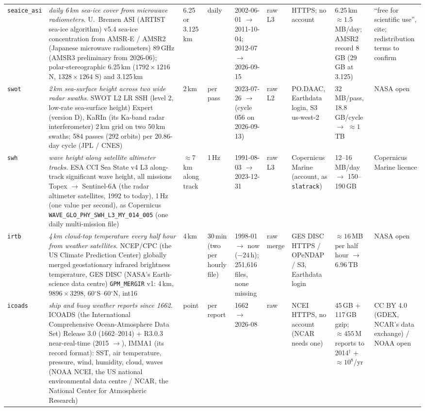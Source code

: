 \documentclass[10pt]{article}
\newcommand{\code}[1]{\texttt{#1}}
\begin{document}
{\begin{longtable}{@{}L{1.7cm}L{2.85cm}L{1.15cm}L{1.25cm}L{1.7cm}L{1.15cm}L{1.95cm}L{1.5cm}L{1.45cm}@{}}
\addlinespace
\code{seaice\_\allowbreak asi} & \emph{daily 6\,km sea-ice cover from microwave radiometers.} U.\ Bremen ASI (ARTIST sea-ice algorithm) v5.4 sea-ice concentration from AMSR-E / AMSR2 (Japanese microwave radiometers) 89\,GHz (AMSR3 preliminary from 2026-06); polar-stereographic 6.25\,km ($1792\times1216$ N, $1328\times1264$ S) and 3.125\,km & 6.25 or 3.125\,km & daily & 2002-06-01 $\to$ 2011-10-04; 2012-07 $\to$ 2026-09-15 & raw L3 & HTTPS; no account & 6.25\,km $\approx 1.5$\,MB/day; AMSR2 record 8\,GB (29\,GB at 3.125) & ``free for scientific use'', cite; redistribution terms to confirm \\
\addlinespace
\code{swot} & \emph{2\,km sea-surface height across two wide radar swaths.} SWOT L2 LR SSH (level 2, low-rate sea-surface height) Expert (version D), KaRIn (its Ka-band radar interferometer) 2\,km grid on two 50\,km swaths; 584 passes (292 orbits) per 20.86-day cycle (JPL / CNES) & 2\,km & per pass & 2023-07-26 $\to$ (cycle 056 on 2026-09-13) & raw L2 & PO.DAAC, Earthdata login, S3 us-west-2 & 32\,MB/pass, 18.8\,GB/cycle $\to$ $\approx 1$\,TB & NASA open \\
\addlinespace
\code{swh} & \emph{wave height along satellite altimeter tracks.} ESA CCI Sea State v4 L3 along-track significant wave height, all missions Topex $\to$ Sentinel-6A (the radar altimeter satellites, 1992 to today), 1\,Hz (one value per second), as Copernicus \code{WAVE\_GLO\_\allowbreak PHY\_SWH\_\allowbreak L3\_MY\_014\_005} (one daily multi-mission file) & $\approx 7$\,km along track & 1\,Hz & 1991-08-03 $\to$ 2023-12-31 & raw L3 & Copernicus Marine (account, as \code{slatrack}) & 12--16\,MB/day $\to$ 150--190\,GB & Copernicus Marine licence \\
\addlinespace
\code{irtb} & \emph{4\,km cloud-top temperature every half hour from weather satellites.} NCEP/CPC (the US Climate Prediction Center) globally merged geostationary infrared brightness temperature, GES DISC (NASA's Earth-science data centre) \code{GPM\_\allowbreak MERGIR} v1: 4\,km, $9896\times3298$, 60$^\circ$S--60$^\circ$N, int16 & 4\,km & 30\,min (two per hourly file) & 1998-01 $\to$ now ($-24$\,h); 251,616 files, none missing & raw merge & GES DISC HTTPS / OPeNDAP / S3, Earthdata login & $\approx 16$\,MB per half hour $\to$ 6.96\,TB & NASA open \\
\addlinespace
\code{icoads} & \emph{ship and buoy weather reports since 1662.} ICOADS (the International Comprehensive Ocean-Atmosphere Data Set) Release 3.0 (1662--2014) + R3.0.3 near-real-time (2015 $\to$), IMMA1 (its record format): SST, air temperature, pressure, wind, humidity, cloud, waves (NOAA NCEI, the US national environmental data centre / NCAR, the National Center for Atmospheric Research) & point & per report & 1662 $\to$ 2026-08 & raw & NCEI HTTPS, no account (NCAR needs one) & 45\,GB + 117\,GB gzip; $\approx 455$\,M reports to 2014$^\dagger$ + $\approx 10^8$/yr & CC BY 4.0 (GDEX, NCAR's data exchange) / NOAA open \\

\end{longtable}}
\end{document}
